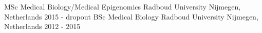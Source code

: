 

\begin{cventries}

\cventry
  { MSc Medical Biology/Medical Epigenomics } %
  { Radboud University } %
  { Nijmegen, Netherlands } %
  { 2015 - dropout } %
  {}
\cventry
  { BSc Medical Biology } %
  { Radboud University } %
  { Nijmegen, Netherlands } %
  { 2012 - 2015 } %
  {}


\end{cventries}